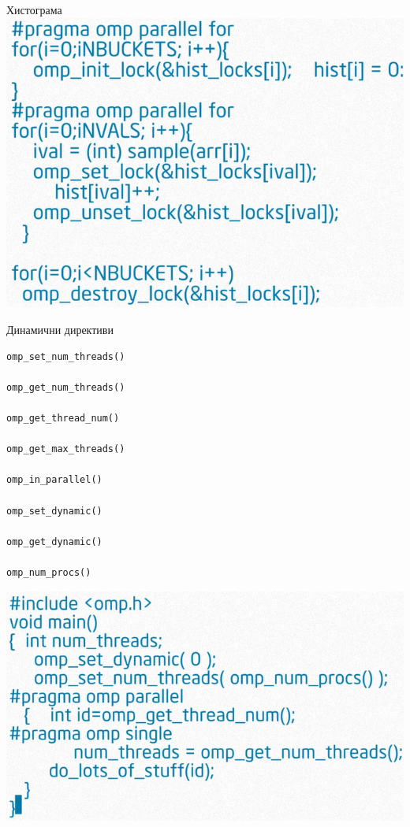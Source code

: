 \documentclass{beamer}
\begin{document}
\begin{frame}[plain]{Хистограма}
\includegraphics[width=\textwidth]{histogram_code}  
\end{frame}

\begin{frame}{Динамични директиви}
\begin{verbatim}
omp_set_num_threads()

omp_get_num_threads()

omp_get_thread_num()

omp_get_max_threads()

omp_in_parallel()

omp_set_dynamic()

omp_get_dynamic()

omp_num_procs()
\end{verbatim}  
\end{frame}

\begin{frame}
  \centering
  \includegraphics[height=0.7\textheight]{num-procs}
\end{frame}
\end{document}
